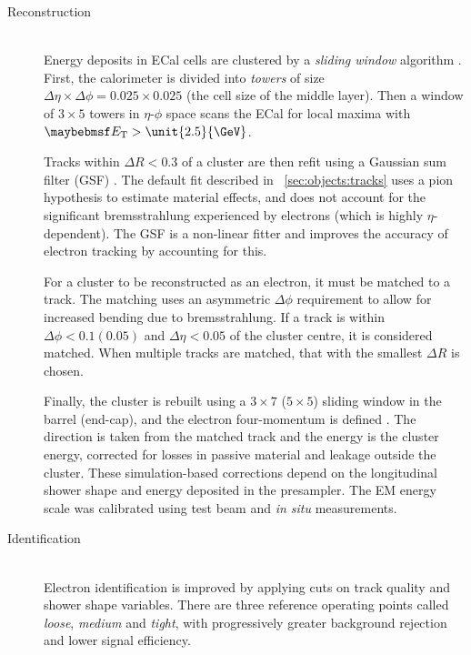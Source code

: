 \begin{description}
\item[Reconstruction] \hfill \\
	Energy deposits in ECal cells are clustered by a \textit{sliding window} 
	algorithm \cite{ElectronPerf:Expect}. First, the calorimeter is divided into 
	\textit{towers} of size $\Delta\eta \times \Delta\phi = 0.025 \times 0.025$ (the 
	cell size of the middle layer). Then a window of $3 \times 5$ towers in $\eta$-$\phi$ 
	space scans the ECal for local maxima with $\et > \unit{2.5}{\GeV}$.

	Tracks within $\Delta R < 0.3$ of a cluster are then refit using a Gaussian sum 
	filter (GSF) \cite{Electron:GSF}. The default fit described in 
	\Section~\ref{sec:objects:tracks} uses a pion hypothesis to estimate material 
	effects, and does not account for the significant bremsstrahlung experienced by 
	electrons (which is highly $\eta$-dependent). The GSF is a non-linear fitter and 
	improves the accuracy of electron tracking by accounting for this.

	For a cluster to be reconstructed as an electron, it must be matched to a track. The 
	matching uses an asymmetric $\Delta\phi$ requirement to allow for increased bending due 
	to bremsstrahlung. If a track is within $\Delta\phi < 0.1 (0.05)$ and 
	$\Delta\eta < 0.05$ of the cluster centre, it is considered matched. When multiple 
	tracks are matched, that with the smallest $\Delta R$ is chosen.

	Finally, the cluster is rebuilt using a $3 \times 7$ ($5 \times 5$) sliding window 
	in the barrel (end-cap), and the electron four-momentum is defined 
	\cite{ElectronPerf:2010}. The direction is taken from the matched track and the 
	energy is the cluster energy, corrected for losses in passive material and leakage 
	outside the cluster. These simulation-based corrections depend on the longitudinal 
	shower shape and energy deposited in the presampler. The EM energy scale was calibrated
	using test beam and \textit{in situ} \HepProcess{\PZ \HepTo \Pe\Pe} measurements.

\item[Identification] \hfill \\
	Electron identification is improved by applying cuts on track quality and shower 
	shape variables. There are three reference operating points called \textit{loose}, 
	\textit{medium} and \textit{tight}, with progressively greater background rejection 
	and lower signal efficiency.
	

\end{description}
